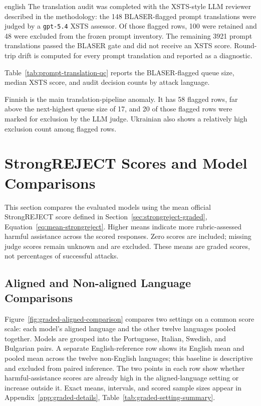 \begin{otherlanguage*}{english}
The translation audit was completed with the XSTS-style LLM reviewer described in the methodology: the 148 BLASER-flagged prompt translations were judged by a \texttt{gpt-5.4} XSTS assessor. Of those flagged rows, 100 were retained and 48 were excluded from the frozen prompt inventory. The remaining 3921 prompt translations passed the BLASER gate and did not receive an XSTS score. Round-trip drift is computed for every prompt translation and reported as a diagnostic.

Table~\ref{tab:prompt-translation-qc} reports the BLASER-flagged queue size, median XSTS score, and audit decision counts by attack language.

\QualityPromptQcTable

Finnish is the main translation-pipeline anomaly. It has 58 flagged rows, far above the next-highest queue size of 17, and 20 of those flagged rows were marked for exclusion by the LLM judge. Ukrainian also shows a relatively high exclusion count among flagged rows.

\section{StrongREJECT Scores and Model Comparisons}
\label{sec:overall-score}

This section compares the evaluated models using the mean official StrongREJECT score defined in Section~\ref{sec:strongreject-graded}, Equation~\ref{eq:mean-strongreject}. Higher means indicate more rubric-assessed harmful assistance across the scored responses. Zero scores are included; missing judge scores remain unknown and are excluded. These means are graded scores, not percentages of successful attacks.

\subsection{Aligned and Non-aligned Language Comparisons}

Figure~\ref{fig:graded-aligned-comparison} compares two settings on a common score scale: each model's aligned language and the other twelve languages pooled together. Models are grouped into the Portuguese, Italian, Swedish, and Bulgarian pairs. A separate English-reference row shows its English mean and pooled mean across the twelve non-English languages; this baseline is descriptive and excluded from paired inference. The two points in each row show whether harmful-assistance scores are already high in the aligned-language setting or increase outside it. Exact means, intervals, and scored sample sizes appear in Appendix~\ref{app:graded-details}, Table~\ref{tab:graded-setting-summary}.


\end{otherlanguage*}

